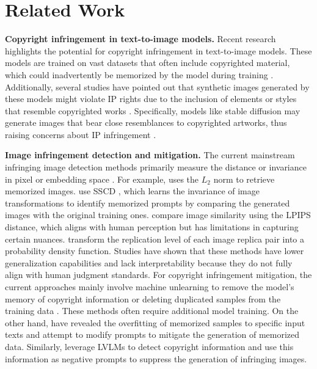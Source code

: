 \section{Related Work}
\label{related}
\textbf{Copyright infringement in text-to-image models.}
Recent research \cite{carlini2023extracting, somepalli2023diffusion, somepalli2023understanding, gu2023memorization, wang2024replication, wen2024detecting, chiba2024probabilistic} highlights the potential for copyright infringement in text-to-image models. These models are trained on vast datasets that often include copyrighted material, which could inadvertently be memorized by the model during training \cite{vyas2023provable, ren2024copyright}. Additionally, several studies have pointed out that synthetic images generated by these models might violate IP rights due to the inclusion of elements or styles that resemble copyrighted works \cite{poland2023generative, wang2024stronger}. Specifically, models like stable diffusion \cite{Rombach_2022_CVPR} may generate images that bear close resemblances to copyrighted artworks, thus raising concerns about IP infringement \cite{shi2024rlcp}. 

\textbf{Image infringement detection and mitigation.}
The current mainstream infringing image detection methods primarily measure the distance or invariance in pixel or embedding space \cite{carlini2023extracting, somepalli2023diffusion, shi2024rlcp, wang2021bag, wang2024image}. For example, \citeauthor{carlini2023extracting} uses the $L_2$ norm to retrieve memorized images. \citeauthor{somepalli2023diffusion} use SSCD \cite{pizzi2022self}, which learns the invariance of image transformations to identify memorized prompts by comparing the generated images with the original training ones. \citeauthor{zhang2018unreasonable} compare image similarity using the LPIPS distance, which aligns with human perception but has limitations in capturing certain nuances. \citeauthor{wang2024image} transform the replication level of each image replica pair into a probability density function. Studies \cite{wen2024detecting, wang2024evaluating} have shown that these methods have lower generalization capabilities and lack interpretability because they do not fully align with human judgment standards. For copyright infringement mitigation, the current approaches mainly involve machine unlearning to remove the model's memory of copyright information \cite{bourtoule2021machine, nguyen2022survey, kumari2023ablating, zhang2024forget} or deleting duplicated samples from the training data \cite{webster2023duplication, somepalli2023understanding}. These methods often require additional model training. On the other hand, \citeauthor{wen2024detecting} have revealed the overfitting of memorized samples to specific input texts and attempt to modify prompts to mitigate the generation of memorized data. Similarly, \citeauthor{wang2024evaluating} leverage LVLMs to detect copyright information and use this information as negative prompts to suppress the generation of infringing images.













